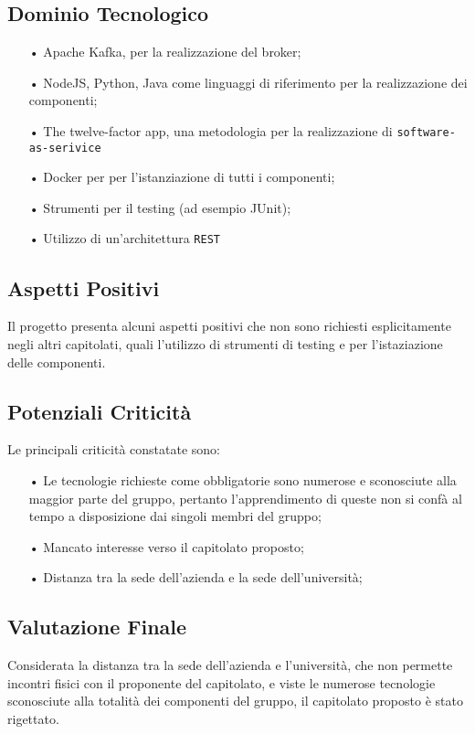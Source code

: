 \subsection{Dominio Tecnologico}
\begin{itemize}
\item[•] Apache Kafka, per la realizzazione del broker;
\item[•] NodeJS, Python, Java come linguaggi di riferimento per la realizzazione dei componenti;
\item[•] The twelve-factor app, una metodologia per la realizzazione di \texttt{software-as-serivice}
\item[•] Docker per per l’istanziazione di
tutti i componenti;
\item[•] Strumenti per il testing (ad esempio JUnit);
\item[•] Utilizzo di un'architettura \texttt{REST}
\end{itemize}
\subsection{Aspetti Positivi}
Il progetto presenta alcuni aspetti positivi che non sono richiesti esplicitamente negli altri capitolati, quali l'utilizzo di strumenti di testing e per l'istaziazione delle componenti. 
\subsection{Potenziali Criticità}
Le principali criticità constatate sono:
\begin{itemize}
\item[•] Le tecnologie richieste come obbligatorie sono numerose e sconosciute alla maggior parte del gruppo, pertanto l'apprendimento di queste non si confà al tempo a disposizione dai singoli membri del gruppo; 
\item[•] Mancato interesse verso il capitolato proposto;
\item[•] Distanza tra la sede dell'azienda e la sede dell'università;
\end{itemize}
\subsection{Valutazione Finale}
Considerata la distanza tra la sede dell'azienda e l'università, che non permette incontri fisici con il proponente del capitolato, e viste le numerose tecnologie sconosciute alla totalità dei componenti del gruppo, il capitolato proposto è stato rigettato.

